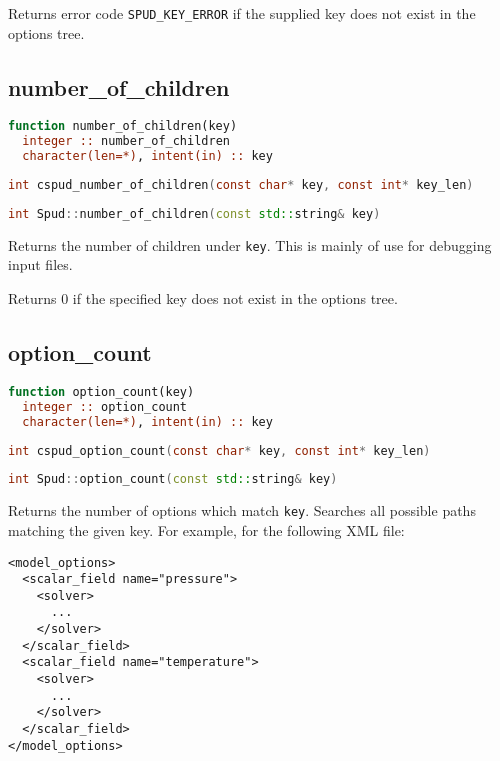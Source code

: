 \documentclass[a4paper, 11pt]{book}
\begin{document}
Returns error code \lstinline+SPUD_KEY_ERROR+ if the supplied key does not
exist in the options tree.

\subsection{number\_of\_children}

\begin{lstlisting}[language=Fortran]
function number_of_children(key)
  integer :: number_of_children
  character(len=*), intent(in) :: key
\end{lstlisting}

\begin{lstlisting}[language=C]
int cspud_number_of_children(const char* key, const int* key_len)
\end{lstlisting}

\begin{lstlisting}[language=C++]
int Spud::number_of_children(const std::string& key)
\end{lstlisting}

Returns the number of children under \lstinline+key+. This is mainly of use
for debugging input files.

Returns 0 if the specified key does not exist in the options tree.

\subsection{option\_count}

\begin{lstlisting}[language=fortran]
function option_count(key)
  integer :: option_count
  character(len=*), intent(in) :: key
\end{lstlisting}

\begin{lstlisting}[language=C]
int cspud_option_count(const char* key, const int* key_len)
\end{lstlisting}

\begin{lstlisting}[language=C++]
int Spud::option_count(const std::string& key)
\end{lstlisting}

Returns the number of options which match \lstinline+key+. Searches all possible
paths matching the given key. For example, for the following XML file:

\begin{verbatim}
<model_options>
  <scalar_field name="pressure">
    <solver>
      ...
    </solver>
  </scalar_field>
  <scalar_field name="temperature">
    <solver>
      ...
    </solver>
  </scalar_field>
</model_options>
\end{verbatim}
\end{document}
